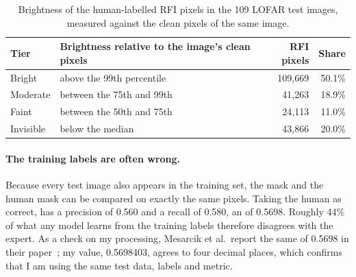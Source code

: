 \begin{table}[H]
  \centering
  \caption{Brightness of the human-labelled RFI pixels in the 109 LOFAR test
    images, measured against the clean pixels of the same image.}
  \label{tab:lofar_tiers}
  \begin{tabular}{llrr}
    \toprule
    Tier & Brightness relative to the image's clean pixels & RFI pixels & Share \\
    \midrule
    Bright    & above the 99th percentile          & 109{,}669 & 50.1\% \\
    Moderate  & between the 75th and 99th          &  41{,}263 & 18.9\% \\
    Faint     & between the 50th and 75th          &  24{,}113 & 11.0\% \\
    Invisible & below the median                   &  43{,}866 & 20.0\% \\
    \bottomrule
  \end{tabular}
\end{table}

\paragraph{The training labels are often wrong.} Because every test image also
appears in the training set, the \aoflagger{} mask and the human mask can be
compared on exactly the same pixels. Taking the human as correct, \aoflagger{}
has a precision of 0.560 and a recall of 0.580, an \Fone{} of 0.5698. Roughly
44\% of what any model learns from the training labels therefore disagrees
with the expert. As a check on my processing, Mesarcik et al.\ report the same
\aoflagger{} \Fone{} of 0.5698 in their paper~\cite{mesarcik2022}; my value,
0.5698403, agrees to four decimal places, which confirms that I am using the
same test data, labels and metric.
